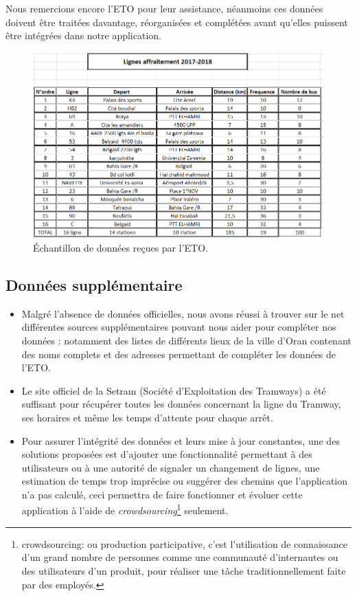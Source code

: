 Nous remercions encore l'ETO pour leur assistance, néanmoins ces données doivent être traitées davantage, réorganisées et complétées avant qu'elles puissent être intégrées dans notre application.

\begin{figure}
	\center
	\includegraphics[scale=0.7]{img/LignesETO.png}
	\caption{Échantillon de données reçues par l'ETO.}
	\label{fig:ETO}
\end{figure}

\subsection{Données supplémentaire}
	\begin{itemize}
		\item Malgré l'absence de données officielles, nous avons réussi à trouver sur le net différentes sources supplémentaires pouvant nous aider pour compléter nos données : notamment des listes de différents lieux de la ville d'Oran contenant des noms complets et des adresses permettant de compléter les données de l'ETO.
		\item Le site officiel de la Setram (Société d'Exploitation des Tramways) a été suffisant pour récupérer toutes les données concernant la ligne du Tramway, ses horaires et même les temps d'attente pour chaque arrêt.
		\item Pour assurer l'intégrité des données et leurs mise à jour constantes, une des solutions proposées est d'ajouter une fonctionnalité permettant à des utilisateurs ou à une autorité de signaler un changement de lignes, une estimation de temps trop imprécise ou suggérer des chemins que l'application n'a pas calculé, ceci permettra de faire fonctionner et évoluer cette application à l'aide de \emph{crowdsourcing}\footnote{crowdsourcing: ou production participative, c'est l'utilisation de connaissance d'un grand nombre de personnes comme une communauté d'internautes ou des utilisateurs d'un produit, pour réaliser une tâche traditionnellement faite par des employés.} seulement.
	\end{itemize}

